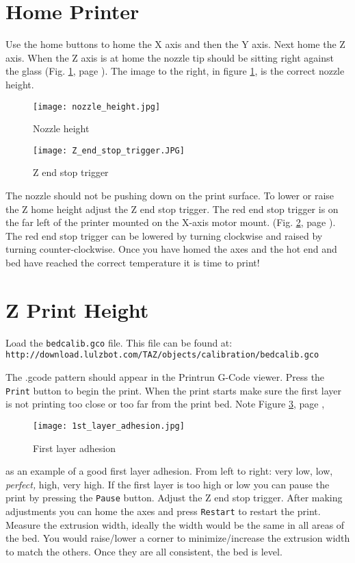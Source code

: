 \section{Home Printer}
Use the home buttons to home the X axis and then the Y axis. Next home the Z axis. When the Z axis is at home the nozzle tip should be sitting right against the glass
(Fig. \ref{fig:nozzle_height}, page \pageref{fig:nozzle_height}). The image to the right, in figure \ref{fig:nozzle_height}, is the correct nozzle height.
\begin{figure}[p]
\centering
\texttt{[image: nozzle\_height.jpg]}
\caption{Nozzle height}
\label{fig:nozzle_height}
\end{figure}
\begin{figure}[p]
\centering
\texttt{[image: Z\_end\_stop\_trigger.JPG]}
\caption{Z end stop trigger}
\label{fig:Z_end_stop_trigger}
\end{figure}
The nozzle should not be pushing down on the print surface. To lower or raise the Z home height adjust the Z end stop trigger. The red end stop trigger is on the far left of the printer mounted on the X-axis motor mount.
(Fig. \ref{fig:Z_end_stop_trigger}, page \pageref{fig:Z_end_stop_trigger}).
The red end stop trigger can be lowered by turning clockwise and raised by turning counter-clockwise. Once you have homed the axes and the hot end and bed have reached the correct temperature it is time to print!

\section{Z Print Height}
Load the \texttt{bedcalib.gco} file.
This file can be found at:
\texttt{http://download.lulzbot.com/TAZ/objects/calibration/bedcalib.gco}

The .gcode pattern should appear in the Printrun G-Code viewer. Press the \texttt{Print} button to begin the print. When the print starts make sure the first layer is not printing too close or too far from the print bed. Note 
Figure \ref{fig:1st_layer_adhesion}, page \pageref{fig:1st_layer_adhesion},
\begin{figure}[hbt]
\centering
\texttt{[image: 1st\_layer\_adhesion.jpg]}
\caption{First layer adhesion}
\label{fig:1st_layer_adhesion}
\end{figure}
as an example of a good first layer adhesion. From left to right: very low, low, \emph{perfect,} high, very high. If the first layer is too high or low you can pause the print by pressing the \texttt{Pause} button. Adjust the Z end stop trigger. After making adjustments you can home the axes and press \texttt{Restart} to restart the print. Measure the extrusion width, ideally the width would be the same in all areas of the bed. You would raise/lower a corner to minimize/increase the extrusion width to match the others. Once they are all consistent, the bed is level.

